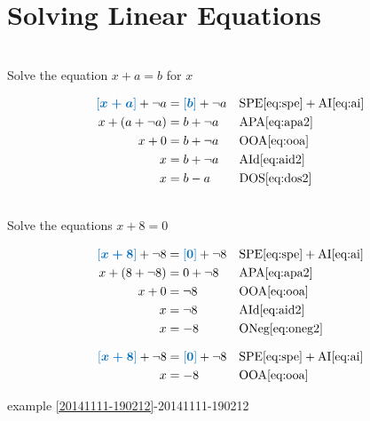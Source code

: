 \documentclass[20150903-160354-rs2.2-MarksMathNotebook.tex]{subfiles}
\begin{document}

\section{Solving Linear Equations}\label{Solving Linear Equations}

\begin{example}[id:20141206-102142] \label{20141206-102142} \hfill \\

Solve the equation $x+a=b$ for $x$

\soln

\solnsteps
\begin{align*}
\farg{x+a} + \neg a  &= \farg{b} + \neg a  && \text{SPE} \eqref{eq:spe} + \text{AI} \eqref{eq:ai} \\
x + (a+\neg a) &= b + \neg a  && \text{APA} \eqref{eq:apa2} \\
x + 0 &= b + \neg a  && \text{OOA} \eqref{eq:ooa} \\
x &= b + \neg a  && \text{AId} \eqref{eq:aid2} \\
x &= b-a  && \text{DOS} \eqref{eq:dos2}
\end{align*}
\end{example}


\begin{example}[id:20141111-222931] \label{20141111-222931} \hfill \\

Solve the equations $x+8=0$

\soln

\solnsteps
\begin{align*}
\farg{x+8}+\neg 8 &= \farg{0}+\neg 8 && \text{SPE} \eqref{eq:spe} + \text{AI} \eqref{eq:ai} \\
x+(8+\neg 8) &= 0 + \neg 8 && \text{APA} \eqref{eq:apa2} \\
x+0 &= \neg 8 && \text{OOA} \eqref{eq:ooa} \\
x &= \neg 8 && \text{AId} \eqref{eq:aid2} \\
x &= -8 && \text{ONeg} \eqref{eq:oneg2}
\end{align*}

\soln

\lesssteps
\begin{align*}
\farg{x+8}+\neg 8 &= \farg{0}+\neg 8 && \text{SPE} \eqref{eq:spe} + \text{AI} \eqref{eq:ai} \\
x &= - 8 && \text{OOA} \eqref{eq:ooa}
\end{align*}

\qdepend

\qdependlist

example \ref{20141111-190212}-20141111-190212

\end{example}
\end{document}

